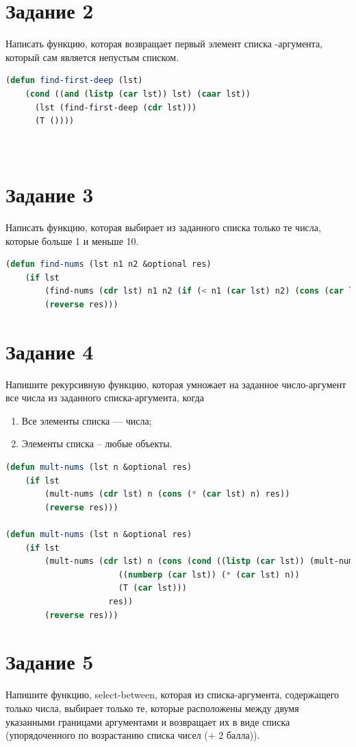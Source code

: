 \documentclass[12pt]{report}
\begin{document}
\section*{Задание 2}
Написать функцию, которая возвращает первый элемент списка -аргумента, который сам является непустым списком.


\begin{lstlisting}[language=Lisp]
(defun find-first-deep (lst)
	(cond ((and (listp (car lst)) lst) (caar lst))
	  (lst (find-first-deep (cdr lst)))
	  (T ())))
  
			  
\end{lstlisting}



\section*{Задание 3}
Написать функцию, которая выбирает из заданного списка только те числа, которые больше 1 и меньше 10. 

\begin{lstlisting}[language=Lisp]
(defun find-nums (lst n1 n2 &optional res)
	(if lst
		(find-nums (cdr lst) n1 n2 (if (< n1 (car lst) n2) (cons (car lst) res) res))
		(reverse res)))
\end{lstlisting}


\section*{Задание 4}
Напишите рекурсивную функцию, которая умножает на заданное число-аргумент все числа из заданного списка-аргумента, когда
\begin{enumerate}
	\item Все элементы списка --- числа;
	\item Элементы списка -- любые объекты.
\end{enumerate}


\begin{lstlisting}[language=Lisp]
(defun mult-nums (lst n &optional res)
	(if lst
		(mult-nums (cdr lst) n (cons (* (car lst) n) res))
		(reverse res)))
  
(defun mult-nums (lst n &optional res)
	(if lst
		(mult-nums (cdr lst) n (cons (cond ((listp (car lst)) (mult-nums (car lst) n))
					   ((numberp (car lst)) (* (car lst) n))
					   (T (car lst)))
					 res))
		(reverse res)))
\end{lstlisting}



\section*{Задание 5}
Напишите функцию, select-between, которая из списка-аргумента, содержащего только
числа, выбирает только те, которые расположены между двумя указанными границами аргументами и возвращает их в виде списка (упорядоченного по возрастанию списка чисел
(+ 2 балла)).
\end{document}
